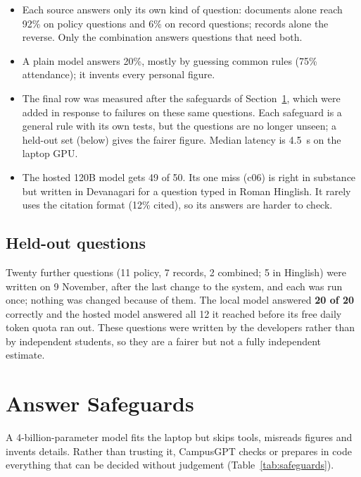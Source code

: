 \documentclass[11pt,a4paper,oneside]{report}
\begin{document}
\begin{itemize}[itemsep=1pt]
  \item Each source answers only its own kind of question: documents alone reach 92\% on
        policy questions and 6\% on record questions; records alone the reverse. Only the
        combination answers questions that need both.
  \item A plain model answers 20\%, mostly by guessing common rules (75\% attendance); it
        invents every personal figure.
  \item The final row was measured after the safeguards of Section~\ref{sec:safeguards},
        which were added in response to failures on these same questions. Each safeguard
        is a general rule with its own tests, but the questions are no longer unseen; a
        held-out set (below) gives the fairer figure. Median latency is 4.5~s on the
        laptop GPU.
  \item The hosted 120B model gets 49 of 50. Its one miss (c06) is right in substance but
        written in Devanagari for a question typed in Roman Hinglish. It rarely uses the
        citation format (12\% cited), so its answers are harder to check.
\end{itemize}

\subsection*{Held-out questions}
Twenty further questions (11 policy, 7 records, 2 combined; 5 in Hinglish) were written on
9 November, after the last change to the system, and each was run once; nothing was changed
because of them. The local model answered \textbf{20 of 20} correctly and the hosted model
answered all 12 it reached before its free daily token quota ran out. These questions were written by the developers rather than by independent students,
so they are a fairer but not a fully independent estimate.

\section{Answer Safeguards}
\label{sec:safeguards}
A 4-billion-parameter model fits the laptop but skips tools, misreads figures and invents
details. Rather than trusting it, CampusGPT checks or prepares in code everything that can
be decided without judgement (Table~\ref{tab:safeguards}).
\end{document}
